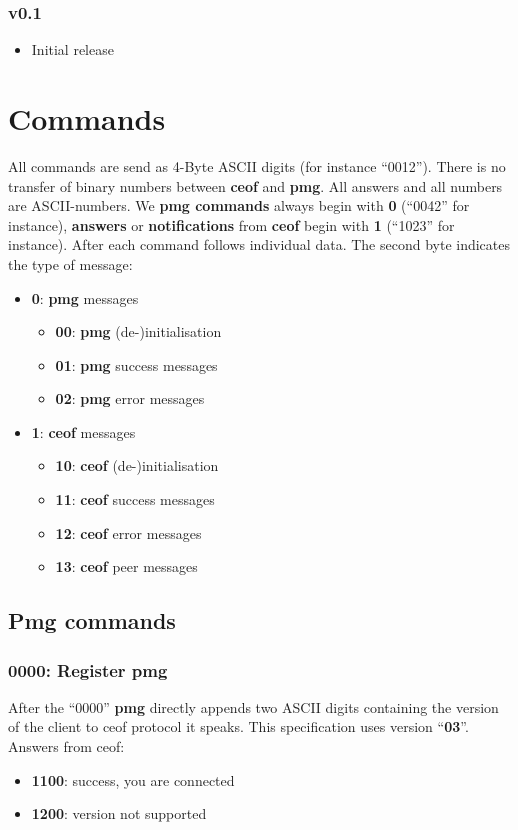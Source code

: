 \documentclass[12pt,a4paper]{book}
\begin{document}
\subsubsection{v0.1}
\begin{itemize}
\item Initial release
\end{itemize}
\section{Commands}
All commands are send as 4-Byte ASCII digits (for instance "`0012"').
There is no transfer of binary numbers between \textbf{ceof} and \textbf{pmg}.
All answers and all numbers are ASCII-numbers. We
\textbf{pmg commands} always begin with \textbf{0} ("`0042"' for instance),
\textbf{answers} or \textbf{notifications} from
\textbf{ceof} begin with \textbf{1} ("`1023"' for instance).
After each command follows individual data. The second byte indicates the type of message:
\begin{itemize}
\item \textbf{0}: \textbf{pmg} messages
\begin{itemize}
\item \textbf{00}: \textbf{pmg} (de-)initialisation
\item \textbf{01}: \textbf{pmg} success messages
\item \textbf{02}: \textbf{pmg} error messages
\end{itemize}
\item \textbf{1}: \textbf{ceof} messages
\begin{itemize}
\item \textbf{10}: \textbf{ceof} (de-)initialisation
\item \textbf{11}: \textbf{ceof} success messages
\item \textbf{12}: \textbf{ceof} error messages
\item \textbf{13}: \textbf{ceof} peer messages
\end{itemize}
\end{itemize}

\subsection{Pmg commands}
\subsubsection{0000: Register pmg}
After the "`0000"' \textbf{pmg} directly appends two ASCII digits containing the
version of the client to ceof protocol it speaks. This specification
uses version "`\textbf{03}"'.
Answers from ceof:
\begin{itemize}
\item \textbf{1100}: success, you are connected
\item \textbf{1200}: version not supported
\end{itemize}
\end{document}
